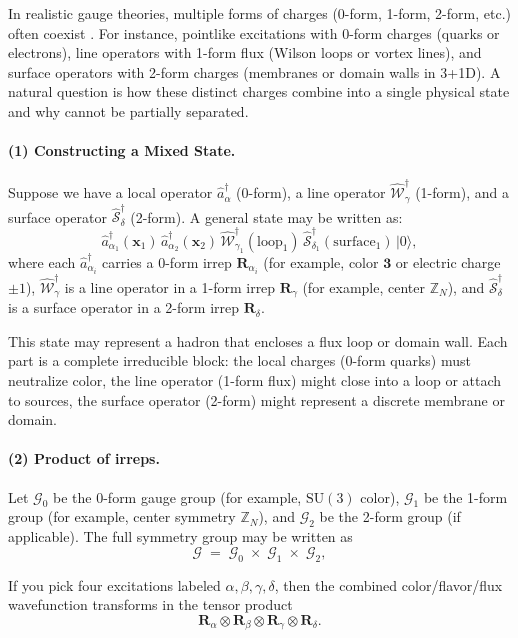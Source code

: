 \documentclass[12pt,a4paper]{article}
\begin{document}
In realistic gauge theories, multiple forms of charges (0-form, 1-form, 2-form, etc.) often coexist \cite{Cordova2019}.
For instance,
pointlike excitations with 0-form charges (quarks or electrons),  
line operators with 1-form flux (Wilson loops or vortex lines),  
and surface operators with 2-form charges (membranes or domain walls in 3+1D).
A natural question is how these distinct charges combine into a single physical state and why cannot be partially separated.


\paragraph{(1) Constructing a Mixed State.}
Suppose we have a local operator $\hat{a}^\dagger_{\alpha}$ (0-form), a line operator $\hat{\mathcal{W}}^\dagger_{\gamma}$ (1-form), and a surface operator $\hat{\mathcal{S}}^\dagger_{\delta}$ (2-form).
A general state may be written as:
\[
\hat{a}^\dagger_{\alpha_1}(\mathbf{x}_1)
\,\hat{a}^\dagger_{\alpha_2}(\mathbf{x}_2)
\,\hat{\mathcal{W}}^\dagger_{\gamma_1}(\mathrm{loop}_1)
\,\hat{\mathcal{S}}^\dagger_{\delta_1}(\mathrm{surface}_1)
\,\bigl\lvert 0 \bigr\rangle,
\]
where
each $\hat{a}^\dagger_{\alpha_i}$ carries a 0-form irrep $\mathbf{R}_{\alpha_i}$ (for example, color $\mathbf{3}$ or electric charge $\pm1$),
$\hat{\mathcal{W}}^\dagger_{\gamma}$ is a line operator in a 1-form irrep $\mathbf{R}_\gamma$ (for example, center $\mathbb{Z}_N$),  
and $\hat{\mathcal{S}}^\dagger_{\delta}$ is a surface operator in a 2-form irrep $\mathbf{R}_\delta$.


This state may represent a hadron that encloses a flux loop or domain wall.
Each part is a complete irreducible block:
the local charges (0-form quarks) must neutralize color,
the line operator (1-form flux) might close into a loop or attach to sources,
the surface operator (2-form) might represent a discrete membrane or domain. 


\paragraph{(2) Product of irreps.}
Let $\mathcal{G}_{0}$ be the 0-form gauge group (for example, $\mathrm{SU}(3)$ color),
$\mathcal{G}_{1}$ be the 1-form group (for example, center symmetry $\mathbb{Z}_N$),
and $\mathcal{G}_{2}$ be the 2-form group (if applicable).
The full symmetry group may be written as
\[
\mathcal{G}
\;=\;
\mathcal{G}_0 \;\times\; \mathcal{G}_1 \;\times\; \mathcal{G}_2,
\]


If you pick four excitations labeled $\alpha, \beta, \gamma, \delta$,
then the combined color/flavor/flux wavefunction transforms in the tensor product
\[
\mathbf{R}_\alpha \otimes \mathbf{R}_\beta \otimes \mathbf{R}_\gamma \otimes \mathbf{R}_\delta.
\]
\end{document}
